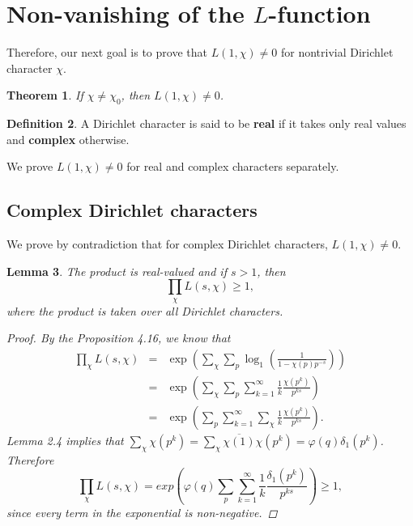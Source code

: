 \documentclass[psamsfonts]{amsart}
\newtheorem{thm}{Theorem}[section]
\newtheorem{lem}[thm]{Lemma}
\theoremstyle{definition}
\newtheorem{defn}[thm]{Definition}
\theoremstyle{remark}
\numberwithin{equation}{section}
\begin{document}
		\section{Non-vanishing of the $L$-function}
		Therefore, our next goal is to prove that $L(1,\chi) \neq 0$ for nontrivial Dirichlet character $\chi$.
			\begin{thm}
				If $\chi \neq \chi_0$, then $L(1,\chi) \neq 0$.
			\end{thm}
			
			\begin{defn}
				A Dirichlet character is said to be \textbf{real} if it takes only real values and \textbf{complex} otherwise.
			\end{defn}	
			We prove $L(1,\chi) \neq 0$ for real and complex characters separately.
			
			\subsection{Complex Dirichlet characters} We prove by contradiction that for complex Dirichlet characters, $L(1,\chi) \neq 0$.
			\begin{lem}
				The product is real-valued and if $s > 1$, then
				\begin{equation}
					\prod_{\chi} L(s,\chi) \geq 1,
				\end{equation}
				where the product is taken over all Dirichlet characters.
				\begin{proof}
					By the Proposition 4.16, we know that
					\begin{eqnarray}
						\prod_{\chi}L(s,\chi) &=& \exp(\sum_{\chi}\sum_p \log_1(\frac{1}{1-\chi(p)p^{-s}})) \nonumber \\
						&=& \exp\left(\sum_{\chi}\sum_{p}\sum_{k=1}^{\infty} \frac{1}{k} \frac{\chi(p^k)}{p^{ks}}\right) \nonumber \\
						&=& \exp\left(\sum_p\sum_{k=1}^{\infty}\sum_{\chi} \frac{1}{k} \frac{\chi(p^k)}{p^{ks}}\right).
					\end{eqnarray}
					Lemma 2.4 implies that $\sum_{\chi} \chi(p^k) = \sum_{\chi} \overline{\chi(1)} \chi(p^k) = \varphi(q) \delta_1(p^k)$. Therefore
					\begin{equation}
						\prod_{\chi}L(s,\chi) = exp\left(\varphi(q)\sum_{p}\sum_{k=1}^{\infty} \frac{1}{k} \frac{\delta_1(p^k)}{p^{ks}}\right) \geq 1,
					\end{equation}
					since every term in the exponential is non-negative.
				\end{proof}
			\end{lem}
			
\end{document}
